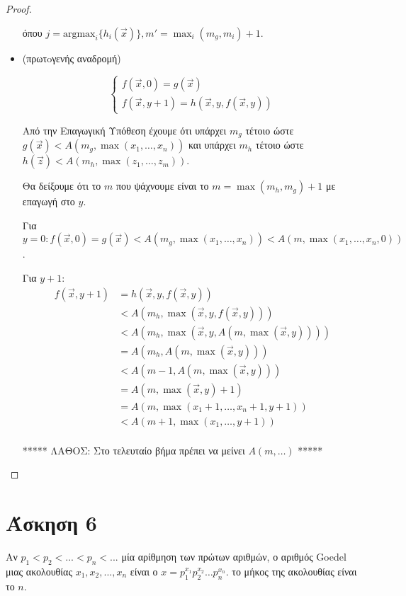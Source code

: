 \documentclass[a4paper, oneside, 11pt]{article}
\theoremstyle{definition}
\newcommand{\ora}{\vec}
\begin{document}
\begin{proof}
\begin{itemize}
όπου $j = \text{argmax}_i \{ h_i(\ora{x}) \}, m' = \max_i(m_g, m_i) + 1$.

\item (πρωτoγενής αναδρομή)

\[ \left\{ \begin{array}{l}
f(\ora{x}, 0) = g(\ora{x})\\
f(\ora{x}, y+1) = h(\ora{x}, y, f(\ora{x}, y))
\end{array} \right.
\]

Από την Επαγωγική Υπόθεση έχουμε ότι υπάρχει $m_g$ τέτοιο ώστε $g(\ora{x}) <
A(m_g, \max(x_1, \ldots, x_n))$ και υπάρχει $m_h$ τέτοιο ώστε $h(\ora{z})
< A(m_h, \max(z_1, \ldots, z_m))$.

Θα δείξουμε ότι το $m$ που ψάχνουμε είναι το $m = \max(m_h, m_g) + 1$ με επαγωγή
στο $y$.

Για $y = 0: f(\ora{x}, 0) = g(\ora{x}) < A(m_g, \max(x_1, \ldots, x_n)) < A(m,
\max(x_1, \ldots, x_n, 0))$.

Για $y+1$:
\begin{align*}
f(\ora{x}, y+1) &= h(\ora{x}, y, f(\ora{x}, y))\\
                &< A(m_h, \max(\ora{x}, y, f(\ora{x}, y)))\\
                &< A(m_h, \max(\ora{x}, y, A(m, \max(\ora{x}, y))))\\
                &= A(m_h, A(m, \max(\ora{x}, y)))\\
                &< A(m-1, A(m, \max(\ora{x}, y)))\\
                &= A(m, \max(\ora{x}, y) + 1)\\
                &= A(m, \max(x_1+1, \ldots, x_n+1, y+1))\\
                &< A(m+1, \max(x_1, \ldots, y+1))\\
\end{align*}

***** ΛΑΘΟΣ: Στο τελευταίο βήμα πρέπει να μείνει $A(m, \ldots)$ *****

\end{itemize}
\end{proof}

\section*{Άσκηση 6}
Αν $p_1<p_2<...<p_n<...$ μία αρίθμηση των πρώτων αριθμών, ο αριθμός Goedel μιας ακολουθίας $x_1,x_2,...,x_n$ είναι ο
$x = p_1^{x_1}p_2^{x_2}\dots p_n^{x_n}$. το μήκος της ακολουθίας είναι το $n$.
\end{document}
